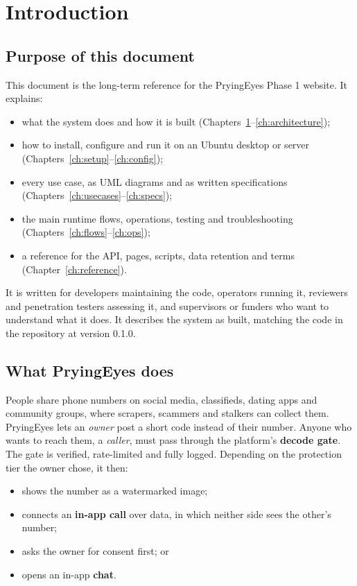 \chapter{Introduction}
\label{ch:intro}

\section{Purpose of this document}

This document is the long-term reference for the PryingEyes Phase 1 website. It explains:
\begin{itemize}
  \item what the system does and how it is built (Chapters~\ref{ch:intro}--\ref{ch:architecture});
  \item how to install, configure and run it on an Ubuntu desktop or server (Chapters~\ref{ch:setup}--\ref{ch:config});
  \item every use case, as UML diagrams and as written specifications (Chapters~\ref{ch:usecases}--\ref{ch:specs});
  \item the main runtime flows, operations, testing and troubleshooting (Chapters~\ref{ch:flows}--\ref{ch:ops});
  \item a reference for the API, pages, scripts, data retention and terms (Chapter~\ref{ch:reference}).
\end{itemize}

It is written for developers maintaining the code, operators running it, reviewers and penetration testers assessing it, and supervisors or funders who want to understand what it does. It describes the system as built, matching the code in the  repository at version 0.1.0.

\section{What PryingEyes does}

People share phone numbers on social media, classifieds, dating apps and community groups, where scrapers, scammers and stalkers can collect them. PryingEyes lets an \emph{owner} post a short code instead of their number. Anyone who wants to reach them, a \emph{caller}, must pass through the platform's \textbf{decode gate}. The gate is verified, rate-limited and fully logged. Depending on the protection tier the owner chose, it then:
\begin{itemize}
  \item shows the number as a watermarked image;
  \item connects an \textbf{in-app call} over data, in which neither side sees the other's number;
  \item asks the owner for consent first; or
  \item opens an in-app \textbf{chat}.
\end{itemize}

